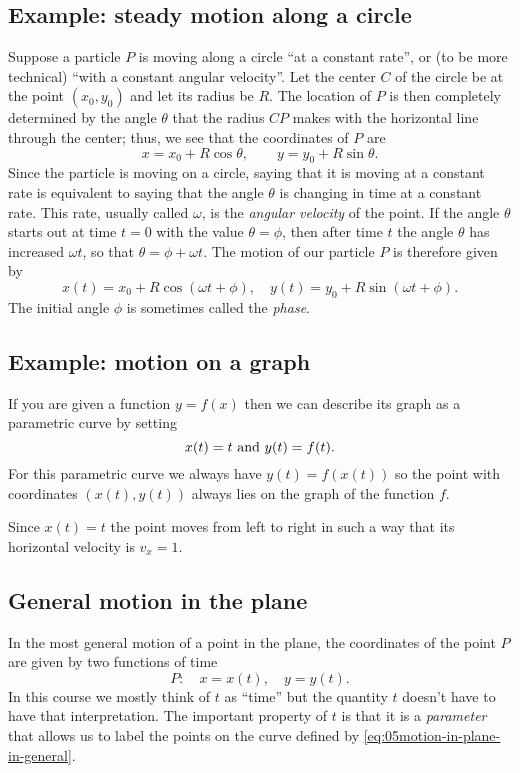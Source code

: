 \subsection{Example: steady motion along a circle} %
Suppose a particle $P$ is moving along a circle ``at a constant rate'',
or (to be more technical) ``with a constant angular velocity''.  Let the center
$C$ of the circle be at the point $(x_0, y_0)$ and let its radius be $R$.  The
location of $P$ is then completely determined by the angle $\theta$ that the
radius $CP$ makes with the horizontal line through the center; thus, we see that
the coordinates of $P$ are
\[
x = x_0 + R\cos \theta, \qquad y=y_0+R\sin \theta.
\]
Since the particle is moving on a circle, saying that it is moving at a constant rate is equivalent to saying that the angle $\theta$ is changing in time at a constant
rate.  This rate, usually called $\omega$, is the \emph{angular velocity} of the
point.  If the angle $\theta$ starts out at time $t=0$ with the value
$\theta=\phi$, then after time $t$ the angle $\theta$ has increased $\omega t$,
so that $\theta = \phi+\omega t$.  The motion of our particle $P$ is therefore
given by
\begin{equation}
  x(t) = x_0 + R\cos (\omega t + \phi), \quad
  y(t) = y_0 + R\sin (\omega t + \phi).
  \label{eq:05motion-on-circle}
\end{equation}
The initial angle $\phi$ is sometimes called the \emph{phase}.




\subsection{Example: motion on a graph} %
\label{sec:motion-on-a-graph}
\hangindent-170pt\noindent%
If you are given a function $y=f(x)$ then we can describe its graph as a
parametric curve by setting
\[\displaywidth180pt
  x(t) = t \text{ and }y(t)= f(t).
\]
For this parametric curve we always have $y(t) = f(x(t))$ so the point with
coordinates $(x(t), y(t))$ always lies on the graph of the function $f$.
\centerline{ }




Since $x(t) = t$ the point moves from left to right in such a way that its
horizontal velocity is $v_x=1$.




\subsection{General motion in the plane} %
In the most general motion of a point in the plane, the coordinates of the point
$P$ are given by two functions of time
\begin{equation}
  P:\quad x = x(t), \quad y = y(t).
  \label{eq:05motion-in-plane-in-general}
\end{equation}
In this course we mostly think of $t$ as ``time'' but the quantity $t$ doesn't
have to have that interpretation.  The important property of $t$ is that it is
a \emph{parameter} that allows us to label the points on the curve defined by
\eqref{eq:05motion-in-plane-in-general}.


